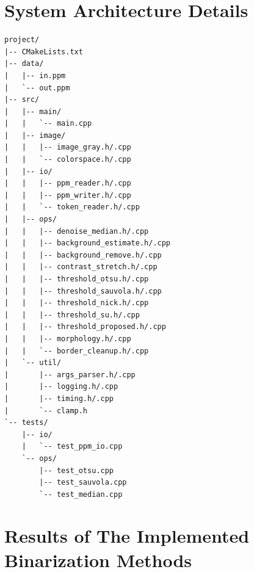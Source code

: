 \appendix

\section{System Architecture Details}

\begin{lstlisting}[caption={Project directory structure}, label={lst:project_structure}, style=tree]
project/
|-- CMakeLists.txt
|-- data/
|   |-- in.ppm
|   `-- out.ppm
|-- src/
|   |-- main/
|   |   `-- main.cpp
|   |-- image/
|   |   |-- image_gray.h/.cpp
|   |   `-- colorspace.h/.cpp
|   |-- io/
|   |   |-- ppm_reader.h/.cpp
|   |   |-- ppm_writer.h/.cpp
|   |   `-- token_reader.h/.cpp
|   |-- ops/
|   |   |-- denoise_median.h/.cpp
|   |   |-- background_estimate.h/.cpp
|   |   |-- background_remove.h/.cpp
|   |   |-- contrast_stretch.h/.cpp
|   |   |-- threshold_otsu.h/.cpp
|   |   |-- threshold_sauvola.h/.cpp
|   |   |-- threshold_nick.h/.cpp
|   |   |-- threshold_su.h/.cpp
|   |   |-- threshold_proposed.h/.cpp
|   |   |-- morphology.h/.cpp
|   |   `-- border_cleanup.h/.cpp
|   `-- util/
|       |-- args_parser.h/.cpp
|       |-- logging.h/.cpp
|       |-- timing.h/.cpp
|       `-- clamp.h
`-- tests/
    |-- io/
    |   `-- test_ppm_io.cpp
    `-- ops/
        |-- test_otsu.cpp
        |-- test_sauvola.cpp
        `-- test_median.cpp
\end{lstlisting}


\section{Results of The Implemented Binarization Methods}

